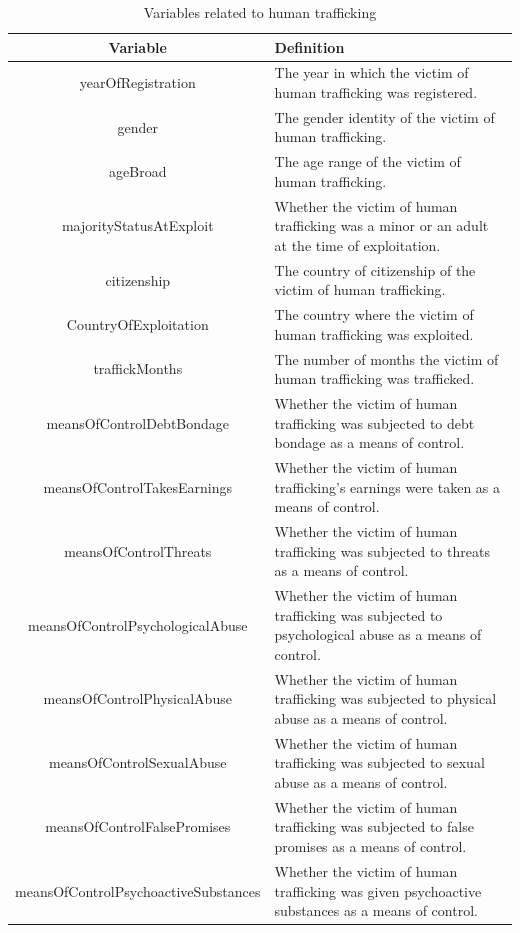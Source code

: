 \documentclass{article} %
\begin{document}
\FloatBarrier
	\begin{longtable}{|c|p{8cm}|}
		\caption{Variables related to human trafficking}
		\label{tab:human-trafficking-variables}\\
		\hline
		\textbf{Variable} & \textbf{Definition} \\
		\hline
		yearOfRegistration & The year in which the victim of human trafficking was registered. \\
		\hline
		gender & The gender identity of the victim of human trafficking. \\
		\hline
		ageBroad & The age range of the victim of human trafficking. \\
		\hline
		majorityStatusAtExploit & Whether the victim of human trafficking was a minor or an adult at the time of exploitation. \\
		\hline
		citizenship & The country of citizenship of the victim of human trafficking. \\
		\hline
		CountryOfExploitation & The country where the victim of human trafficking was exploited. \\
		\hline
		traffickMonths & The number of months the victim of human trafficking was trafficked. \\
		\hline
		meansOfControlDebtBondage & Whether the victim of human trafficking was subjected to debt bondage as a means of control. \\
		\hline
		meansOfControlTakesEarnings & Whether the victim of human trafficking's earnings were taken as a means of control. \\
		\hline
		meansOfControlThreats & Whether the victim of human trafficking was subjected to threats as a means of control. \\
		\hline
		meansOfControlPsychologicalAbuse & Whether the victim of human trafficking was subjected to psychological abuse as a means of control. \\
		\hline
		meansOfControlPhysicalAbuse & Whether the victim of human trafficking was subjected to physical abuse as a means of control. \\
		\hline
		meansOfControlSexualAbuse & Whether the victim of human trafficking was subjected to sexual abuse as a means of control. \\
		\hline
		meansOfControlFalsePromises & Whether the victim of human trafficking was subjected to false promises as a means of control. \\
		\hline
		meansOfControlPsychoactiveSubstances & Whether the victim of human trafficking was given psychoactive substances as a means of control. \\

\end{longtable}
\end{document}

